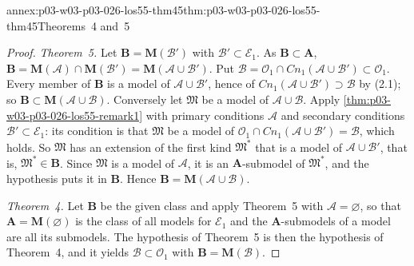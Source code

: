\begin{annexitem}{annex:p03-w03-p03-026-los55-thm45}{thm:p03-w03-p03-026-los55-thm45}{Theorems~4 and~5}
\begin{proof}
\emph{Theorem~5.}  Let \(\mathbf B=\mathbf M(\mathcal B')\) with
\(\mathcal B'\subset\mathcal E_1\).  As \(\mathbf B\subset\mathbf A\),
\(\mathbf B=\mathbf M(\mathcal A)\cap\mathbf M(\mathcal B')=\mathbf M(\mathcal A\cup\mathcal B')\).
Put \(\mathcal B=\mathcal O_1\cap\mathit{Cn}_1(\mathcal A\cup\mathcal B')\subset\mathcal O_1\).
Every member of \(\mathbf B\) is a model of \(\mathcal A\cup\mathcal B'\), hence
of \(\mathit{Cn}_1(\mathcal A\cup\mathcal B')\supset\mathcal B\) by (2.1); so
\(\mathbf B\subset\mathbf M(\mathcal A\cup\mathcal B)\).  Conversely let
\(\mathfrak M\) be a model of \(\mathcal A\cup\mathcal B\).  Apply
\cref{thm:p03-w03-p03-026-los55-remark1} with primary conditions
\(\mathcal A\) and secondary conditions \(\mathcal B'\subset\mathcal E_1\): its
condition is that \(\mathfrak M\) be a model of
\(\mathcal O_1\cap\mathit{Cn}_1(\mathcal A\cup\mathcal B')=\mathcal B\), which
holds.  So \(\mathfrak M\) has an extension of the first kind \(\mathfrak M^*\)
that is a model of \(\mathcal A\cup\mathcal B'\), that is, \(\mathfrak M^*\in\mathbf B\).
Since \(\mathfrak M\) is a model of \(\mathcal A\), it is an
\(\mathbf A\)-submodel of \(\mathfrak M^*\), and the hypothesis puts it in
\(\mathbf B\).  Hence \(\mathbf B=\mathbf M(\mathcal A\cup\mathcal B)\).

\emph{Theorem~4.}  Let \(\mathbf B\) be the given class and apply Theorem~5
with \(\mathcal A=\varnothing\), so that \(\mathbf A=\mathbf M(\varnothing)\) is
the class of all models for \(\mathcal E_1\) and the \(\mathbf A\)-submodels
of a model are all its submodels.  The hypothesis of Theorem~5 is then the
hypothesis of Theorem~4, and it yields \(\mathcal B\subset\mathcal O_1\) with
\(\mathbf B=\mathbf M(\mathcal B)\).
\end{proof}
\end{annexitem}

